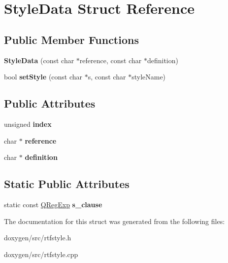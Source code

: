 \hypertarget{struct_style_data}{}\section{Style\+Data Struct Reference}
\label{struct_style_data}
\subsection*{Public Member Functions}
\begin{DoxyCompactItemize}
\item 
\mbox{\label{struct_style_data_a3b478669fea15283276db4a036582c12}} 
{\bfseries Style\+Data} (const char $\ast$reference, const char $\ast$definition)
\item 
\mbox{\label{struct_style_data_ae62e4fcfe258807c0dcdffcaf82500f8}} 
bool {\bfseries set\+Style} (const char $\ast$s, const char $\ast$style\+Name)
\end{DoxyCompactItemize}
\subsection*{Public Attributes}
\begin{DoxyCompactItemize}
\item 
\mbox{\label{struct_style_data_ac74fb0d3bea6b08d24488c66dabae064}} 
unsigned {\bfseries index}
\item 
\mbox{\label{struct_style_data_aa83b48b8d838f93571decb3160be8c0a}} 
char $\ast$ {\bfseries reference}
\item 
\mbox{\label{struct_style_data_a604f4e5cb27a87ada3ca30bd4b196650}} 
char $\ast$ {\bfseries definition}
\end{DoxyCompactItemize}
\subsection*{Static Public Attributes}
\begin{DoxyCompactItemize}
\item 
\mbox{\label{struct_style_data_a33092391b83203d69fc4532b460cec39}} 
static const \mbox{\hyperlink{class_q_reg_exp}{Q\+Reg\+Exp}} {\bfseries s\+\_\+clause}
\end{DoxyCompactItemize}


The documentation for this struct was generated from the following files\+:\begin{DoxyCompactItemize}
\item 
doxygen/src/rtfstyle.\+h\item 
doxygen/src/rtfstyle.\+cpp\end{DoxyCompactItemize}

